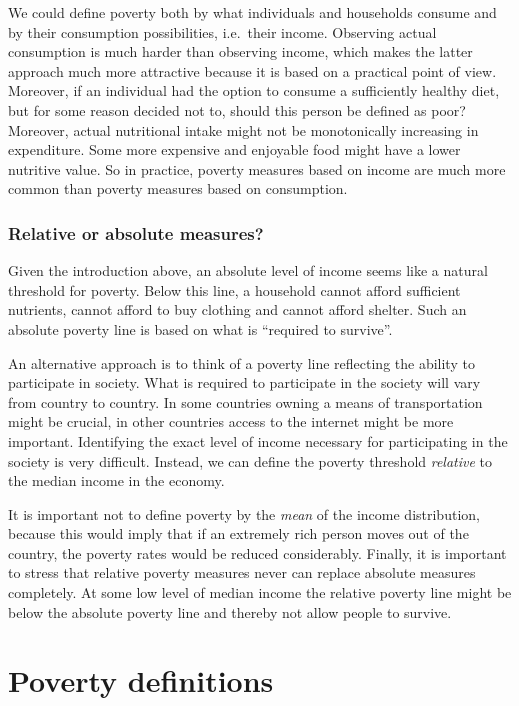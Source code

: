 \documentclass[
]{book}
\begin{document}
We could define poverty both by what individuals and households consume and by their consumption possibilities, i.e.~their income. Observing actual consumption is much harder than observing income, which makes the latter approach much more attractive because it is based on a practical point of view. Moreover, if an individual had the option to consume a sufficiently healthy diet, but for some reason decided not to, should this person be defined as poor? Moreover, actual nutritional intake might not be monotonically increasing in expenditure. Some more expensive and enjoyable food might have a lower nutritive value. So in practice, poverty measures based on income are much more common than poverty measures based on consumption.

\hypertarget{relative-or-absolute-measures}{%
\subsubsection*{Relative or absolute measures?}\label{relative-or-absolute-measures}}

Given the introduction above, an absolute level of income seems like a natural threshold for poverty. Below this line, a household cannot afford sufficient nutrients, cannot afford to buy clothing and cannot afford shelter. Such an absolute poverty line is based on what is ``required to survive''.

An alternative approach is to think of a poverty line reflecting the ability to participate in society. What is required to participate in the society will vary from country to country. In some countries owning a means of transportation might be crucial, in other countries access to the internet might be more important. Identifying the exact level of income necessary for participating in the society is very difficult. Instead, we can define the poverty threshold \emph{relative} to the median income in the economy.

It is important not to define poverty by the \emph{mean} of the income distribution, because this would imply that if an extremely rich person moves out of the country, the poverty rates would be reduced considerably. Finally, it is important to stress that relative poverty measures never can replace absolute measures completely. At some low level of median income the relative poverty line might be below the absolute poverty line and thereby not allow people to survive.

\hypertarget{poverty-definitions}{%
\section*{Poverty definitions}\label{poverty-definitions}}
\end{document}
